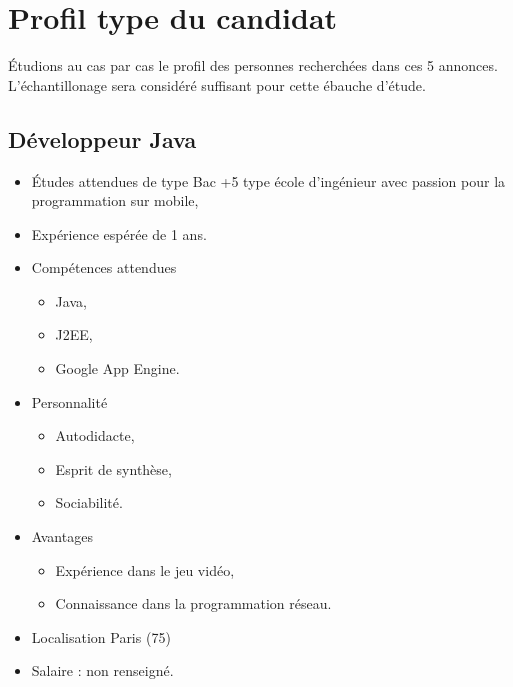 \documentclass[12pt, a4paper]{report} %
\begin{document}
\section{Profil type du candidat}
Étudions au cas par cas le profil des personnes recherchées dans ces 5 annonces. L'échantillonage sera considéré suffisant pour cette ébauche d'étude.

\subsection{Développeur Java}
\begin{itemize}
\item Études attendues de type Bac +5 type école d'ingénieur avec passion pour la programmation sur mobile,
\item Expérience espérée de 1 ans.
\item Compétences attendues  
  \begin{itemize}
    \item  Java,
    \item  J2EE,
    \item  Google App Engine.
  \end{itemize}
\item Personnalité 
  \begin{itemize}
    \item Autodidacte,
    \item Esprit de synthèse,
    \item Sociabilité.
  \end{itemize}
\item Avantages 
  \begin{itemize}
    \item Expérience dans le jeu vidéo,
    \item Connaissance dans la programmation réseau.
  \end{itemize}
\item Localisation  Paris (75)
\item Salaire : non renseigné.
\end{itemize}

\end{document}
